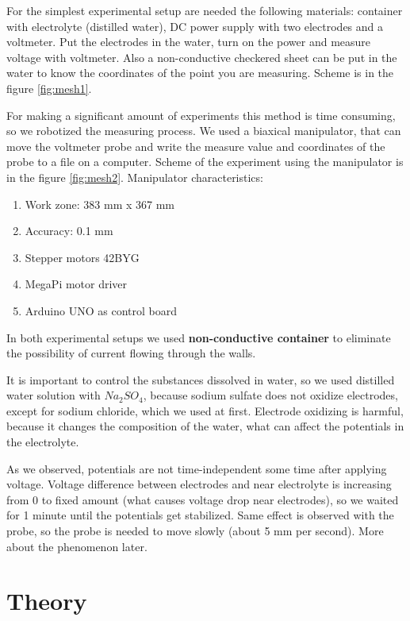 \documentclass{article}
\begin{document}
For the simplest experimental setup are needed the following materials: container with electrolyte (distilled water), DC power supply with two electrodes and a voltmeter. Put the electrodes in the water, turn on the power and measure voltage with voltmeter. Also a non-conductive checkered sheet can be put in the water to know the coordinates of the point you are measuring. Scheme is in the figure \ref{fig:mesh1}.  \par

For making a significant amount of experiments this method is time consuming, so we robotized the measuring process. We used a biaxical manipulator, that can move the voltmeter probe and write the measure value and coordinates of the probe to a file on a computer. Scheme of the experiment using the manipulator is in the figure \ref{fig:mesh2}. Manipulator characteristics:
\begin{enumerate}
\item Work zone: 383 mm x 367 mm
\item Accuracy: 0.1 mm
\item Stepper motors 42BYG
\item MegaPi motor driver
\item Arduino UNO as control board
\end{enumerate}

In both experimental setups we used \textbf{non-conductive container} to eliminate the possibility of current flowing through the walls.\par

It is important to control the substances dissolved in water, so we used distilled water solution with $Na_2SO_4$, because sodium sulfate does not oxidize electrodes, except for sodium chloride, which we used at first. Electrode oxidizing is harmful, because it changes the composition of the water, what can affect the potentials in the electrolyte.\par

As we observed, potentials are not time-independent some time after applying voltage. Voltage difference between electrodes and near electrolyte is increasing from 0 to fixed amount (what causes voltage drop near electrodes), so we waited for 1 minute until the potentials get stabilized. Same effect is observed with the probe, so the probe is needed to move slowly (about 5 mm per second). More about the phenomenon later. \par


\section{Theory}
\end{document}
